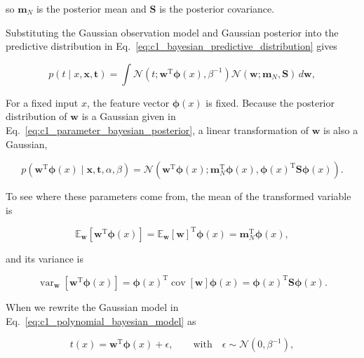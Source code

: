 \documentclass[10pt,twocolumn]{memoir}
\begin{document}
so $\mathbf{m}_N$ is the posterior mean and $\mathbf{S}$ is the posterior covariance.

Substituting the Gaussian observation model and Gaussian posterior into the predictive distribution in Eq.~\ref{eq:c1_bayesian_predictive_distribution} gives

\begin{equation}
    p(t\mid x,\mathbf{x},\mathbf{t}) = \int\mathcal{N}\left(t;\mathbf{w}^{\mathrm{T}}\boldsymbol{\phi}(x),\beta^{-1}\right)\mathcal{N}\left(\mathbf{w};\mathbf{m}_N,\mathbf{S}\right)\,d\mathbf{w},
\end{equation}

For a fixed input $x$, the feature vector $\boldsymbol{\phi}(x)$ is fixed. Because the posterior distribution of $\mathbf{w}$ is a Gaussian given in Eq.~\ref{eq:c1_parameter_bayesian_posterior}, a linear transformation of $\mathbf{w}$ is also a Gaussian,

\begin{equation}
    p(\mathbf{w}^{\mathrm{T}}\boldsymbol{\phi}(x)\mid\mathbf{x},\mathbf{t},\alpha,\beta) = \mathcal{N} \left(\mathbf{w}^{\mathrm{T}}\boldsymbol{\phi}(x); \mathbf{m}_N^{\mathrm{T}}\boldsymbol{\phi}(x),\boldsymbol{\phi}(x)^{\mathrm{T}}\mathbf{S}\boldsymbol{\phi}(x)\right).
\label{eq:c1_feature_posterior}
\end{equation}

To see where these parameters come from, the mean of the transformed variable is

\begin{equation}
    \mathbb{E}_{\mathbf{w}}\left[\mathbf{w}^{\mathrm{T}}\boldsymbol{\phi}(x)\right] = \mathbb{E}_{\mathbf{w}}[\mathbf{w}]^{\mathrm{T}} \boldsymbol{\phi}(x) = \mathbf{m}_N^{\mathrm{T}}\boldsymbol{\phi}(x),
\end{equation}

and its variance is

\begin{equation}
    \operatorname{var}_{\mathbf{w}}\left[\mathbf{w}^{\mathrm{T}}\boldsymbol{\phi}(x)\right] = \boldsymbol{\phi}(x)^{\mathrm{T}}\operatorname{cov}[\mathbf{w}]\boldsymbol{\phi}(x) = \boldsymbol{\phi}(x)^{\mathrm{T}}\mathbf{S}\boldsymbol{\phi}(x).
\end{equation}

When we rewrite the Gaussian model in Eq.~\ref{eq:c1_polynomial_bayesian_model} as

\begin{equation}
    t(x) = \mathbf{w}^{\mathrm{T}}\boldsymbol{\phi}(x) + \epsilon, \qquad \mathrm{with} \quad \epsilon \sim \mathcal{N}(0,\beta^{-1}),
\end{equation}
\end{document}
